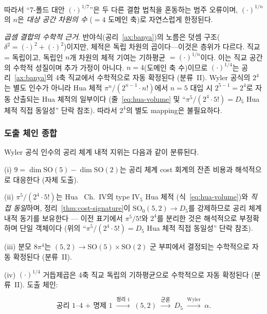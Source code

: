 \documentclass[entropy,article,submit,pdftex,oneauthor]{Definitions/mdpi}
\begin{document}
따라서 ``7-폴드 대안 $(\cdot)^{1/7}$''은 두 다른 결합 법칙을 혼동하는 범주 오류이며, $(\cdot)^{1/n}$의 $n$은 \emph{대상 공간 차원의 수} ($= 4$ 도메인 축)로 자연스럽게 한정된다.

\textit{곱셈 결합의 수학적 근거}. 반야식(공리~\ref{ax:banya})의 노름은 덧셈 구조($\delta^2 = (\cdot)^2 + (\cdot)^2$)이지만, 체적은 독립 차원의 곱이다---이것은 층위가 다르다. 직교 = 독립이고, 독립인 $n$개 차원의 체적 기여는 기하평균 $= (\cdot)^{1/n}$이다. 이는 직교 공간의 수학적 성질이며 추가 가정이 아니다. $n = 4$(도메인 축 수)이므로 $(\cdot)^{1/4}$는 공리~\ref{ax:banya}의 4축 직교에서 수학적으로 자동 확정된다 (분류~II). Wyler 공식의 $2^4$는 별도 인수가 아니라 Hua 체적 $\pi^n/(2^{n-1} \cdot n!)$에서 $n=5$ 대입 시 $2^{5-1} = 2^4$로 자동 산출되는 Hua 체적의 일부이다 (줄~\eqref{eq:hua-volume} 및 ``$\pi^5/(2^4 \cdot 5!) = D_5$ Hua 체적 직접 동일성'' 단락 참조). 따라서 $2^4$의 별도 mapping은 불필요하다.

\subsubsection{도출 체인 종합}

Wyler 공식 인수의 공리 체계 내적 지위는 다음과 같이 분류된다.

(i) $9 = \dim\mathrm{SO}(5)-\dim\mathrm{SO}(2)$는 공리 체계 cost 회계의 잔존 비용과 해석적으로 대응한다 (자체 도출).

(ii) $\pi^5/(2^4 \cdot 5!)$는 Hua~\cite{hua1963} Ch.~IV의 type IV$_5$ Hua 체적 (식~\eqref{eq:hua-volume})와 \emph{직접 동일}하며, 정리~\ref{thm:cost-signature}이 $\mathrm{SO}_0(5,2) \to D_5$를 강제하므로 공리 체계 내적 동기를 보유한다 — 이전 표기에서 $\pi^5/5!$와 $2^4$를 분리한 것은 해석적으로 부정확하며 단일 객체이다 (위의 ``$\pi^5/(2^4 \cdot 5!) = D_5$ Hua 체적 직접 동일성'' 단락 참조).

(iii) 분모 $8\pi^4$는 $(5,2) \to \mathrm{SO}(5)\times\mathrm{SO}(2)$ 군 부피에서 결정되는 수학적으로 자동 확정된다 (분류~II).

(iv) $(\cdot)^{1/4}$ 거듭제곱은 4축 직교 독립의 기하평균으로 수학적으로 자동 확정된다 (분류~II). 도출 체인:
\begin{linenomath}
\begin{equation}
\text{공리~1--4 + 명제~1} \;\xrightarrow{\text{정리~1}}\; (5,2) \;\xrightarrow{\text{군론}}\; D_5 \;\xrightarrow{\text{Wyler}}\; \alpha.
\end{equation}
\end{linenomath}

\end{document}

